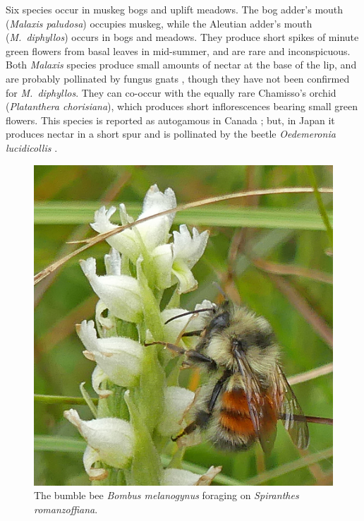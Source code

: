 \begin{multicols}{2}
Six species occur in muskeg bogs and uplift meadows. The bog adder's
mouth (\emph{Malaxis paludosa}) occupies muskeg, while the Aleutian
adder's mouth (\emph{M.\ diphyllos}) occurs in bogs and meadows. They
produce short spikes of minute green flowers from basal leaves in
mid-summer, and are rare and inconspicuous. Both \emph{Malaxis} species
produce small amounts of nectar at the base of the lip, and are probably
pollinated by fungus gnats \citep[][]{ReevesReeves1984}, though they
have not been confirmed for \emph{M.\ diphyllos}. They can co-occur with
the equally rare Chamisso's orchid (\emph{Platanthera chorisiana}),
which produces short inflorescences bearing small green flowers. This
species is reported as autogamous in Canada \citep{Catling1984}; but, in
Japan it produces nectar in a short spur and is pollinated by the beetle
\emph{Oedemeronia lucidicollis} \citep{Inoue1981}.


\begin{figure}[H]
\begin{center}
\vspace{2mm}
\includegraphics[width=\textwidth]{img/Bombus_melanogynus.jpg}
\caption{The bumble bee \emph{Bombus melanogynus} foraging on \emph{Spiranthes romanzoffiana}.}
\label{Bombus_melanogynus}
\end{center}
\end{figure}



\end{multicols}
